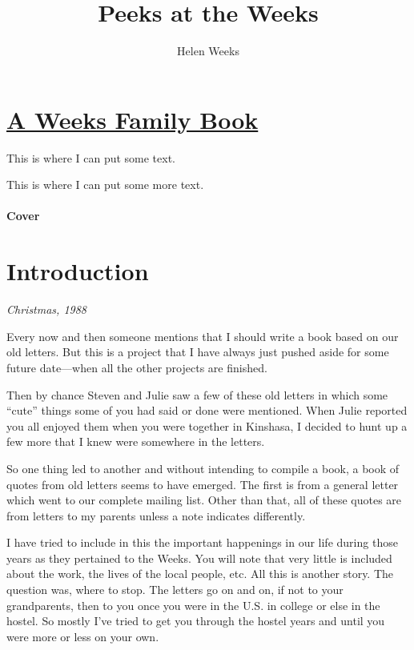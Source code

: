\documentclass[
]{book}
\title{Peeks at the Weeks}
\author{Helen Weeks}
\date{}
\begin{document}
\maketitle

{
\setcounter{tocdepth}{1}
\tableofcontents
}
\hypertarget{a-weeks-family-book}{%
\chapter*{\texorpdfstring{\href{https://beggarsborn.com/peeks-at-the-weeks/}{A Weeks Family Book}}{A Weeks Family Book}}\label{a-weeks-family-book}}

This is where I can put some text.

This is where I can put some more text.

\hypertarget{cover}{%
\subsubsection*{Cover}\label{cover}}

\hypertarget{introduction}{%
\chapter*{Introduction}\label{introduction}}

\emph{Christmas, 1988}

Every now and then someone mentions that I should write a book based on our old letters. But this is a project that I have always just pushed aside for some future date---when all the other projects are finished.

Then by chance Steven and Julie saw a few of these old letters in which some ``cute'' things some of you had said or done were mentioned. When Julie reported you all enjoyed them when you were together in Kinshasa, I decided to hunt up a few more that I knew were somewhere in the letters.

So one thing led to another and without intending to compile a book, a book of quotes from old letters seems to have emerged. The first is from a general letter which went to our complete mailing list. Other than that, all of these quotes are from letters to my parents unless a note indicates differently.

I have tried to include in this the important happenings in our life during those years as they pertained to the Weeks. You will note that very little is included about the work, the lives of the local people, etc. All this is another story. The question was, where to stop. The letters go on and on, if not to your grandparents, then to you once you were in the U.S. in college or else in the hostel. So mostly I've tried to get you through the hostel years and until you were more or less on your own.
\end{document}
